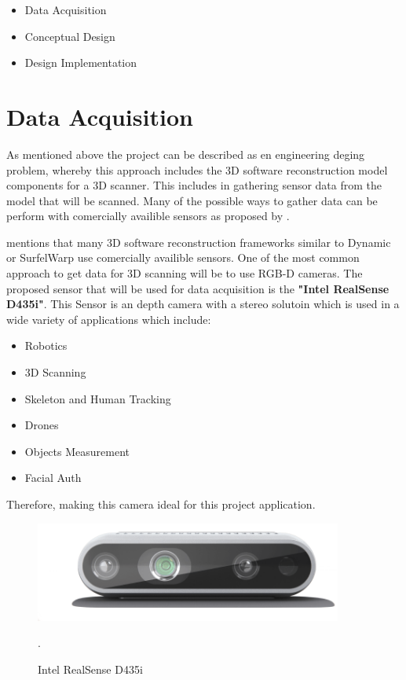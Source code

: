 \documentclass[12pt]{report}
\begin{document}
\begin{itemize}
  \item Data Acquisition
  \item Conceptual Design
  \item Design Implementation
\end{itemize}


\section{Data Acquisition}
As mentioned above the project can be described as en engineering deging problem, whereby this approach includes the 3D software reconstruction model components for a 3D scanner. 
This includes in gathering sensor data from the model that will be scanned. Many of the possible ways to gather data can be perform with comercially availible sensors as proposed by \citet*{article}.

\citet{3D_scann_cultural} mentions that many 3D software reconstruction frameworks similar to Dynamic or SurfelWarp use comercially availible sensors.
One of the most common approach to get data for 3D scanning will be to use RGB-D cameras. The proposed sensor that will be used for data acquisition is the 
\textbf{"Intel RealSense D435i"}. This Sensor is an depth camera with a stereo solutoin which is used in a wide variety of applications which include: 
\begin{itemize}
  \item Robotics
  \item 3D Scanning
  \item Skeleton and Human Tracking
  \item Drones
  \item Objects Measurement
  \item Facial Auth
\end{itemize}
\enlargethispage{\baselineskip}
Therefore, making this camera ideal for this project application.
\begin{figure}[h]
  \centering
  \includegraphics[width=0.9\textwidth]{d435i-1.png}
  \caption{Intel RealSense D435i}\citep*{intelrealsense}.
  \label{fig:d435i}
\end{figure}
\end{document}
